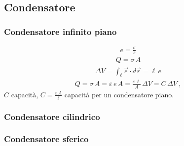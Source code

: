 \documentclass[letterpaper,10pt,italian]{jupyterBook}
\begin{document}
\subsection{Condensatore}
\label{\detokenize{ch/electromagnetism/electrostatics:condensatore}}\label{\detokenize{ch/electromagnetism/electrostatics:physics-hs-electromagnetism-electrostatics-capacitor}}

\subsubsection{Condensatore infinito piano}
\label{\detokenize{ch/electromagnetism/electrostatics:condensatore-infinito-piano}}\label{\detokenize{ch/electromagnetism/electrostatics:physics-hs-electromagnetism-electrostatics-capacitor-flat}}\begin{equation*}
\begin{split}e = \frac{\sigma}{\varepsilon}\end{split}
\end{equation*}\begin{equation*}
\begin{split}Q = \sigma \, A\end{split}
\end{equation*}\begin{equation*}
\begin{split}\Delta V = \int_{\ell} \vec{e} \cdot d \vec{r} = \ell \, e\end{split}
\end{equation*}\begin{equation*}
\begin{split} Q = \sigma \, A = \varepsilon \, e \, A = \frac{\varepsilon \, \ell}{A} \, \Delta V = C \, \Delta V \ ,\end{split}
\end{equation*}
\sphinxAtStartPar
\(C\) capacità, \(C = \frac{\varepsilon \, A}{\ell}\) capacità per un condensatore piano.
\subsubsection*{Condensatore cilindrico}

\sphinxAtStartPar
{}
\subsubsection*{Condensatore sferico}
\end{document}
